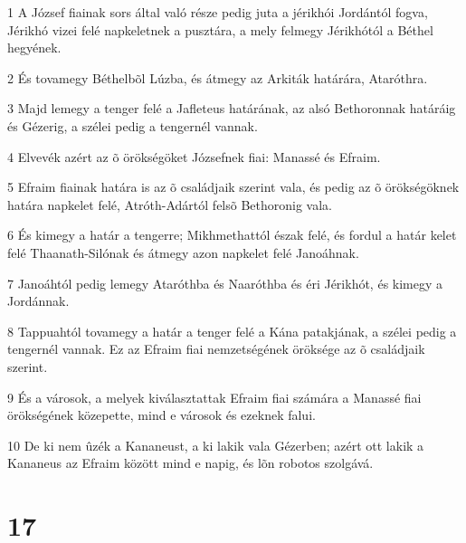 \par 1 A József fiainak sors által való része pedig juta a jérikhói Jordántól fogva, Jérikhó vizei felé napkeletnek a pusztára, a mely felmegy Jérikhótól a Béthel hegyének.
\par 2 És tovamegy Béthelbõl Lúzba, és átmegy az Arkiták határára, Ataróthra.
\par 3 Majd lemegy a tenger felé a Jafleteus határának, az alsó Bethoronnak határáig és Gézerig, a szélei pedig a tengernél vannak.
\par 4 Elvevék azért az õ örökségöket Józsefnek fiai: Manassé és Efraim.
\par 5 Efraim fiainak határa is az õ családjaik szerint vala, és pedig az õ örökségöknek határa napkelet felé, Atróth-Adártól felsõ Bethoronig vala.
\par 6 És kimegy a határ a tengerre; Mikhmethattól észak felé, és fordul a határ kelet felé Thaanath-Silónak és átmegy azon napkelet felé Janoáhnak.
\par 7 Janoáhtól pedig lemegy Ataróthba és Naaróthba és éri Jérikhót, és kimegy a Jordánnak.
\par 8 Tappuahtól tovamegy a határ a tenger felé a Kána patakjának, a szélei pedig a tengernél vannak. Ez az Efraim fiai nemzetségének öröksége az õ családjaik szerint.
\par 9 És a városok, a melyek kiválasztattak Efraim fiai számára a Manassé fiai örökségének közepette, mind e városok és ezeknek falui.
\par 10 De ki nem ûzék a Kananeust, a ki lakik vala Gézerben;  azért ott lakik a Kananeus az Efraim között mind e napig, és lõn robotos szolgává.

\chapter{17}


